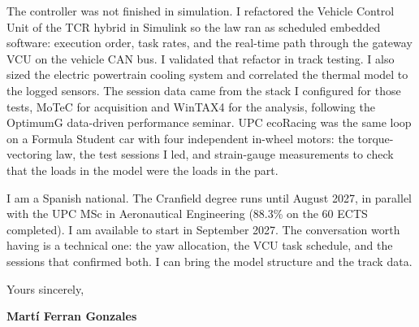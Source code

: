\documentclass[a4paper,11pt]{article}
\newcommand{\availability}{September 2027}
\begin{document}
The controller was not finished in simulation. I refactored the Vehicle Control Unit of the TCR hybrid in Simulink so the law ran as scheduled embedded software: execution order, task rates, and the real-time path through the gateway VCU on the vehicle CAN bus. I validated that refactor in track testing. I also sized the electric powertrain cooling system and correlated the thermal model to the logged sensors. The session data came from the stack I configured for those tests, MoTeC for acquisition and WinTAX4 for the analysis, following the OptimumG data-driven performance seminar. UPC ecoRacing was the same loop on a Formula Student car with four independent in-wheel motors: the torque-vectoring law, the test sessions I led, and strain-gauge measurements to check that the loads in the model were the loads in the part.

I am a Spanish national. The Cranfield degree runs until August 2027, in parallel with the UPC MSc in Aeronautical Engineering (88.3\% on the 60 ECTS completed). I am available to start in \availability. The conversation worth having is a technical one: the yaw allocation, the VCU task schedule, and the sessions that confirmed both. I can bring the model structure and the track data.

Yours sincerely,\par
\setlength{\parskip}{0pt}
\vspace{12pt}
\nointerlineskip
\textbf{Martí Ferran Gonzales}
\end{document}
